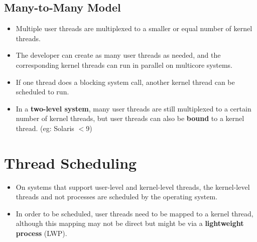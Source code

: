 \documentclass{article}
\theoremstyle{plain}
\theoremstyle{definition}
\begin{document}
\subsection{Many-to-Many Model}
\begin{itemize}
    \item Multiple user threads are multiplexed to a smaller or equal number of kernel threads.
    
    \item The developer can create as many user threads as needed, and the corresponding kernel threads can run in parallel on multicore systems.
    
    \item If one thread does a blocking system call, another kernel thread can be scheduled to run. 
    
    \item In a\textbf{ two-level system}, many user threads are still multiplexed to a certain number of kernel threads, but user threads can also be \textbf{bound} to a kernel thread. (eg: Solaris $<$9)
\end{itemize}

\section{Thread Scheduling}
\begin{itemize}
    \item On systems that support user-level and kernel-level threads, the kernel-level threads and not processes are scheduled by the operating system. 
    
    \item In order to be scheduled, user threads need to be mapped to a kernel thread, although this mapping may not be direct but might be via a \textbf{lightweight process} (LWP). 
\end{itemize}
\end{document}
